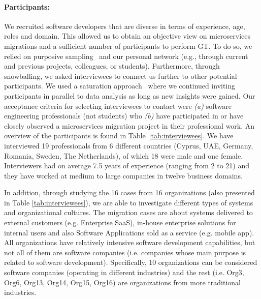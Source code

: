 \documentclass[sigconf,dvipsnames]{acmart}
\begin{document}
\paragraph*{Participants:}
We recruited software developers that are diverse in terms of experience, age, roles and domain. This allowed us to obtain an objective view on microservices migrations and a sufficient number of participants to perform GT. To do so, we relied on purposive sampling~\cite{baltes:20} and our personal network (e.g., through current and previous projects, colleagues, or students). Furthermore, through snowballing, we asked interviewees to connect us further to other potential participants. We used a saturation approach~\cite{charmaz2014constructing} where we continued inviting participants in parallel to data analysis as long as new insights were gained. Our acceptance criteria for selecting interviewees to contact were \emph{(a)} software engineering professionals (not students) who \emph{(b)} have participated in or have closely observed a microservices migration project in their professional work. An overview of the participants is found in Table~\ref{tab:interviewees}. We have interviewed 19 professionals from 6 different countries (Cyprus, UAE, Germany, Romania, Sweden, The Netherlands), of which 18 were male and one female. Interviewers had on average 7.5 years of experience (ranging from 2 to 21) and they have worked at medium to large companies in twelve business domains. 

In addition, through studying the 16 cases from 16 organizations (also presented in Table \ref{tab:interviewees}), we are able to investigate different types of systems and organizational cultures. 
The migration cases are about systems delivered to external customers (e.g. Enterprise SaaS), in-house enterprise solutions for internal users and also Software Applications sold as a service (e.g. mobile app). All organizations have relatively intensive software development capabilities, but not all of them are software companies (i.e. companies whose main purpose is related to software development). Specifically, 10 organizations can be considered software companies (operating in different industries) and the rest (i.e. Org3, Org6, Org13, Org14, Org15, Org16) are organizations from more traditional industries.
\end{document}
